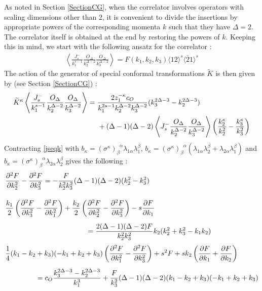 \documentclass[a4paper,11pt]{article}
\begin{document}
As noted in Section \ref{SectionCG}, when the correlator involves operators with scaling dimensions other than 2, it is convenient to divide the insertions by appropriate powers of the corresponding momenta $k$ such that they have $\Delta=2$. The correlator itself is obtained at the end by restoring the powers of $k$. Keeping this in mind, we start with the following ansatz for the correlator :
\begin{align}
\label{jooansatz}
\left\langle \frac{J_s^-}{k_1^{s-1}} \frac{O_{\Delta}}{k_2^{\Delta-2}}\frac{O_{\Delta}}{k_3^{\Delta-2}} \right\rangle = {F}(k_1, k_2, k_3)\langle 12 \rangle^{s} \langle \bar{2}1\rangle^{s}
\end{align}
The action of the generator of special conformal transformations $\widetilde{K}$ is then given by (see Section \ref{SectionCG}) :
\begin{align}\label{jseqk}
\widetilde{K}^{\kappa}\left\langle \frac{J_s^-}{k_1^{s-1}}\frac{O_{\Delta}}{k_2^{\Delta-2}}\frac{O_{\Delta}}{k_3^{\Delta-2}} \right\rangle \nonumber&=\frac{2z_1^{-\kappa}c_O}{k_1^{2s-1} k_2^{\Delta-2}k_3^{\Delta-2}}(k_3^{2\Delta-3}-k_2^{2\Delta-3})\notag\\
&\hspace{.5cm}+(\Delta-1)(\Delta-2)\left\langle J_s^- \frac{O_{\Delta}}{k_2^{\Delta-2}}\frac{O_{\Delta}}{k_3^{\Delta-2}}\right\rangle \left(\frac{k_2^{\kappa}}{k_2^{2}} -\frac{k_3^{\kappa}}{k_3^{2}}\right)
\end{align}
Contracting \eqref{jseqk} with  $b_{\kappa}= (\sigma^{\kappa})_{\beta}^{\;\;\alpha}\lambda_{1\alpha}\lambda_1^{\beta}$, $b_{\kappa}= (\sigma^{\kappa})_{\beta}^{\;\;\alpha}(\lambda_{1\alpha}\lambda_2^{\beta}+\lambda_{2\alpha}\lambda^{\beta}_1)$ and $b_{\kappa}=(\sigma^{\kappa})_{\beta}^{\;\;\alpha}\lambda_{2\alpha}\lambda_2^{\beta}$ gives the following :
\begin{align}
\label{jsooeqn1}
&\frac{\partial^2 {F}}{\partial k_2^2}-\frac{\partial^2 {F}}{\partial k_3^2}= -\frac{{F}}{k_2^{2}k_3^{2}}(\Delta-1)(\Delta-2)(k_2^2-k_3^2)\\[10 pt]
\label{jsooeqn2}
&\frac{k_1}{2}\left(\frac{\partial^2 {F}}{\partial k_3^2}-\frac{\partial^2 {F}}{\partial k_1^2}\right)+\frac{k_2}{2}\left(\frac{\partial^2 {F}}{\partial k_2^2}-\frac{\partial^2 {F}}{\partial k_3^2}\right)-s\frac{\partial {F}}{\partial k_1}\notag\\[5pt]
&\hspace{4cm}=\frac{2(\Delta-1)(\Delta-2){F}}{k_2^{2}k_3^{2}}k_2(k_2^2+k_3^2-k_1k_2)\\[3pt]
\label{jsooeqn3}
&\frac{1}{4}(k_1-k_2+k_3)(-k_1+k_2+k_3)\left(\frac{\partial^2 {F}}{\partial k_1^2}-\frac{\partial^2 {F}}{\partial k_3^2}\right)+s^2 {F}+s k_2\left(\frac{\partial {F}}{\partial k_1}+\frac{\partial {F}}{\partial k_2}\right)\notag\\[5 pt]
&\hspace{1.5cm}=c_O\frac{k_3^{2\Delta-3}-k_2^{2\Delta-3}}{k_1^3}+\frac{{F}}{k_3^{2}}(\Delta-1)(\Delta-2)(k_1-k_2+k_3)(-k_1+k_2+k_3)
\end{align}
\end{document}
